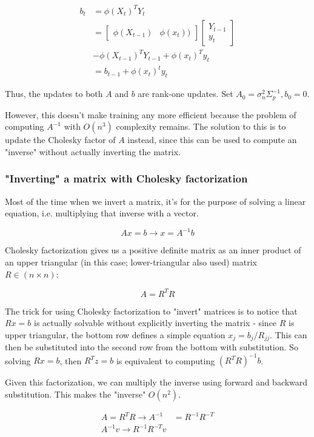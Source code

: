\documentclass[a4paper]{article}
\begin{document}
\begin{align*}
b_t &= \phi(X_t)^T Y_t  \\
&= \begin{bmatrix} \phi(X_{t-1}) & \phi(x_t)) \end{bmatrix} \begin{bmatrix} Y_{t-1}\\ y_t \end{bmatrix} \\
&- \phi(X_{t-1})^T Y_{t-1} + \phi(x_t)^T y_t \\
&= b_{t-1} + \phi(x_t)^t y_t
\end{align*}

Thus, the updates to both $A$ and $b$ are rank-one updates. Set $A_0 = \sigma_n^2 \Sigma_p^{-1}, b_0=0$. 

However, this doesn't make training any more efficient because the problem of computing $A^{-1}$ with $O(n^3)$ complexity remains. The solution to this is to update the Cholesky factor of $A$ instead, since this can be used to compute an "inverse" without actually inverting the matrix. 


\subsubsection*{"Inverting" a matrix with Cholesky factorization}

Most of the time when we invert a matrix, it's for the purpose of solving a linear equation, i.e. multiplying that inverse with a vector. 

$$Ax=b \rightarrow x = A^{-1}b$$

Cholesky factorization gives us a positive definite matrix as an inner product of an upper triangular (in this case; lower-triangular also used) matrix $R\in (n \times n)$: 

$$A=R^T R$$

The trick for using Cholesky factorization to "invert" matrices is to notice that $Rx=b$ is actually solvable without explicitly inverting the matrix - since $R$ is upper triangular, the bottom row defines a simple equation $x_j=b_j/R_{jj}$. This can then be substituted into the second row from the bottom with substitution. So solving $Rx=b$, then $R^T z = b$ is equivalent to computing $(R^T R)^{-1}b$. 

Given this factorization, we can multiply the inverse using forward and backward substitution. This makes the "inverse" $O(n^2)$.

\begin{align*}
A = R^T R \rightarrow A^{-1} &= R^{-1}R^{-T} \\
A^{-1} v \rightarrow R^{-1}R^{-T} v
\end{align*}
\end{document}
